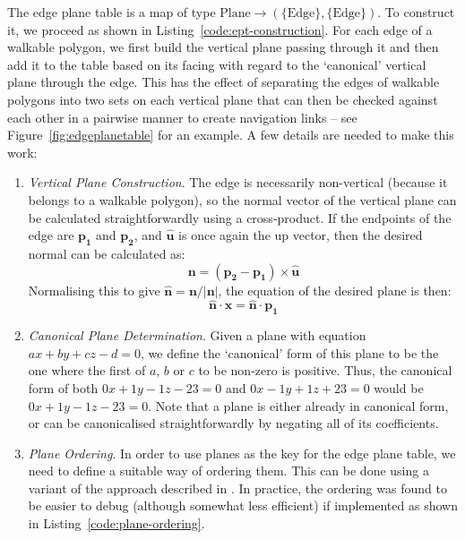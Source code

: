 \documentclass[10pt,twocolumn]{article}
\begin{document}
The edge plane table is a map of type $\mbox{Plane} \to (\{\mbox{Edge}\},\{\mbox{Edge}\})$. To construct it, we proceed as shown in Listing~\ref{code:ept-construction}. For each edge of a walkable polygon, we first build the vertical plane passing through it and then add it to the table based on its facing with regard to the `canonical' vertical plane through the edge. This has the effect of separating the edges of walkable polygons into two sets on each vertical plane that can then be checked against each other in a pairwise manner to create navigation links -- see Figure~\ref{fig:edgeplanetable} for an example. A few details are needed to make this work:
%
\begin{enumerate}

\item \emph{Vertical Plane Construction}. The edge is necessarily non-vertical (because it belongs to a walkable polygon), so the normal vector of the vertical plane can be calculated straightforwardly using a cross-product. If the endpoints of the edge are $\mathbf{p_1}$ and $\mathbf{p_2}$, and $\mathbf{\hat{u}}$ is once again the up vector, then the desired normal can be calculated as:
%
\[
\mathbf{n} = (\mathbf{p_2} - \mathbf{p_1}) \times \mathbf{\hat{u}}
\]
%
Normalising this to give $\mathbf{\hat{n}} = \mathbf{n} / \left|\mathbf{n}\right|$, the equation of the desired plane is then:
%
\[
\mathbf{\hat{n}} \cdot \mathbf{x} = \mathbf{\hat{n}} \cdot \mathbf{p_1}
\]

\item \emph{Canonical Plane Determination}. Given a plane with equation $ax + by + cz - d = 0$, we define the `canonical' form of this plane to be the one where the first of $a$, $b$ or $c$ to be non-zero is positive. Thus, the canonical form of both $0x + 1y - 1z - 23 = 0$ and $0x - 1y + 1z + 23 = 0$ would be $0x + 1y - 1z - 23 = 0$. Note that a plane is either already in canonical form, or can be canonicalised straightforwardly by negating all of its coefficients.

\item \emph{Plane Ordering}. In order to use planes as the key for the edge plane table, we need to define a suitable way of ordering them. This can be done using a variant of the approach described in \cite{salesin92}. In practice, the ordering was found to be easier to debug (although somewhat less efficient) if implemented as shown in Listing~\ref{code:plane-ordering}.

\end{enumerate}
\end{document}
